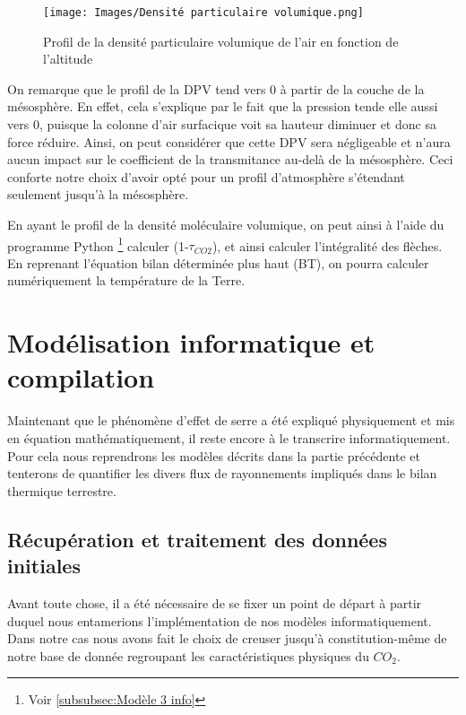 \documentclass[a4paper, 12pt]{report} %
\newcommand{\figcaptionwithsource}[3]{\caption[#1 
            \newline #2]{#1} \addtocontents{lof}{\protect\vspace{1\baselineskip}}}
\begin{document}
\begin{figure}[h]
    \begin{center}
    \texttt{[image: Images/Densité particulaire volumique.png]}
    \figcaptionwithsource{Profil de la densité particulaire volumique de l'air en fonction de l'altitude}{\textit{Python 3.12}}{fig:figure1}
    \label{fig:figure1}
    \end{center} 
\end{figure}

On remarque que le profil de la DPV tend vers 0 à partir de la couche de la mésosphère. En effet, cela s'explique par le fait que la pression tende elle aussi vers 0, puisque la colonne d'air surfacique voit sa hauteur diminuer et donc sa force réduire. Ainsi, on peut considérer que cette DPV sera négligeable et n'aura aucun impact sur le coefficient de la transmitance au-delà de la mésosphère. Ceci conforte notre choix d'avoir opté pour un profil d'atmosphère s'étendant seulement jusqu'à la mésosphère.
\vspace{\baselineskip}

En ayant le profil de la densité moléculaire volumique, on peut ainsi à l'aide du programme Python \footnote{Voir \ref{subsubsec:Modèle 3 info}} calculer (1-$\tau_{CO2}$), et ainsi calculer l'intégralité des flèches.
En reprenant l'équation bilan déterminée plus haut (BT), on pourra calculer numériquement la température de la Terre.

\section{Modélisation informatique et compilation}

    Maintenant que le phénomène d'effet de serre a été expliqué
physiquement et mis en équation mathématiquement, il reste encore à le transcrire informatiquement. Pour cela nous reprendrons les modèles décrits dans la partie précédente et tenterons de quantifier les divers flux de rayonnements impliqués dans le bilan thermique terrestre. 

\subsection{Récupération et traitement des données initiales}

    Avant toute chose, il a été nécessaire de se fixer
un point de départ à partir duquel nous entamerions l'implémentation de nos modèles informatiquement. Dans notre cas nous avons fait le choix de creuser jusqu'à constitution-même de notre base de donnée regroupant les caractéristiques physiques du $CO_2$. \vspace{\baselineskip}
\end{document}
